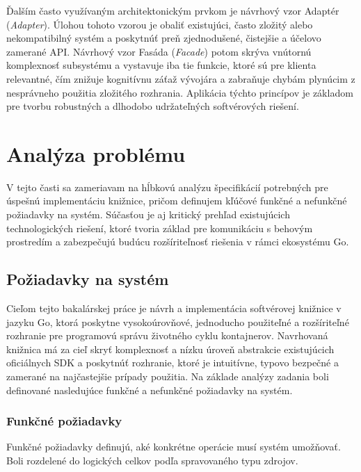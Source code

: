 \documentclass[
 program=infpvs,
  language=slovak,
  figures=false,
  tables=false,
  sourcecodes,
  glossaries,
  index
]{kidiplom}
\begin{document}
{Ďalším často využívaným architektonickým prvkom je návrhový vzor Adaptér (\textit{Adapter}). Úlohou tohoto vzorou je obaliť existujúci, často zložitý alebo nekompatibilný systém a poskytnúť preň zjednodušené, čistejšie a účelovo zamerané API. Návrhový vzor Fasáda (\textit{Facade}) potom skrýva vnútornú komplexnosť subsystému a vystavuje iba tie funkcie, ktoré sú pre klienta relevantné, čím znižuje kognitívnu záťaž vývojára a zabraňuje chybám plynúcim z nesprávneho použitia zložitého rozhrania. Aplikácia týchto princípov je základom pre tvorbu robustných a dlhodobo udržateľných softvérových riešení.



\section{Analýza problému}  \label{sec:analyza}
V tejto časti sa zameriavam na hĺbkovú analýzu špecifikácií potrebných pre úspešnú implementáciu knižnice, pričom definujem kľúčové funkčné a nefunkčné požiadavky na systém. Súčasťou je aj kritický prehľad existujúcich technologických riešení, ktoré tvoria základ pre komunikáciu s behovým prostredím a zabezpečujú budúcu rozšíriteľnosť riešenia v rámci ekosystému Go.



\subsection{Požiadavky na systém}  \label{sec:poziadavky}
Cieľom tejto bakalárskej práce je návrh a implementácia softvérovej knižnice v jazyku Go, ktorá poskytne vysokoúrovňové, jednoducho použiteľné a rozšíriteľné rozhranie pre programovú správu životného cyklu kontajnerov. Navrhovaná knižnica má za cieľ skryť komplexnosť a nízku úroveň abstrakcie existujúcich oficiálnych SDK a poskytnúť rozhranie, ktoré je intuitívne, typovo bezpečné a zamerané na najčastejšie prípady použitia. Na základe analýzy zadania boli definované nasledujúce funkčné a nefunkčné požiadavky na systém.



\subsubsection{Funkčné požiadavky}  \label{sec:funkcne-poziadavky}
Funkčné požiadavky definujú, aké konkrétne operácie musí systém umožňovať. Boli rozdelené do logických celkov podľa spravovaného typu zdrojov.

}
\end{document}
